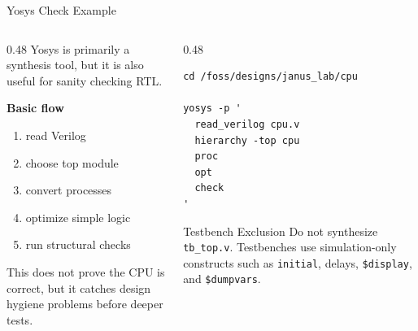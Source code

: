 \documentclass[aspectratio=169,10pt]{beamer}
\begin{document}
\begin{frame}[fragile]{Yosys Check Example}
  \begin{columns}[T]
    \begin{column}{0.48\textwidth}
      Yosys is primarily a synthesis tool, but it is also useful for sanity checking RTL.

      \vspace{0.7em}
      \textbf{Basic flow}
      \begin{enumerate}
        \item read Verilog
        \item choose top module
        \item convert processes
        \item optimize simple logic
        \item run structural checks
      \end{enumerate}

      \vspace{0.7em}
      This does not prove the CPU is correct, but it catches design hygiene problems before deeper tests.
    \end{column}
    \begin{column}{0.48\textwidth}
\begin{lstlisting}[language=Shell]
cd /foss/designs/janus_lab/cpu

yosys -p '
  read_verilog cpu.v
  hierarchy -top cpu
  proc
  opt
  check
'
\end{lstlisting}

      \vspace{0.4em}
      \begin{alertblock}{Testbench Exclusion}
        Do not synthesize \texttt{tb\_top.v}. Testbenches use simulation-only constructs such as \texttt{initial}, delays, \texttt{\$display}, and \texttt{\$dumpvars}.
      \end{alertblock}
    \end{column}
  \end{columns}
\end{frame}
\end{document}
